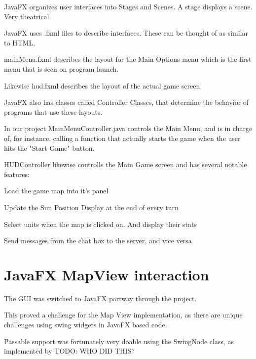 \documentclass[12pt,a4paper]{article}
\begin{document}
JavaFX organizes user interfaces into Stages and Scenes. A stage displays a 
scene. Very theatrical.

JavaFX uses .fxml files to describe interfaces. These can be thought of as
similar to HTML.

mainMenu.fxml describes the layout for the Main Options menu which is the first
menu that is seen on program launch.

Likewise hud.fxml describes the layout of the actual game screen.

JavaFX also has classes called Controller Classes, that determine the behavior
of programs that use these layouts.

In our project MainMenuController.java controls the Main Menu, and is in charge
of, for instance, calling a function that actually starts the game when the
user hits the "Start Game" button.

HUDController likewise controlls the Main Game screen and has several notable
features:

\begin{itemize}
\begin{item} Load the game map into it's panel \end{item}
\begin{item} Update the Sun Position Display at the end of every turn \end{item}
\begin{item} Select units when the map is clicked on. And display their stats
\end{item}
\begin{item} Send messages from the chat box to the server, and vice versa
\end{item}
\end{itemize}

\section{JavaFX MapView interaction}
The GUI was switched to JavaFX partway through the project.

This proved a challenge for the Map View implementation, as there are unique
challenges using swing widgets in JavaFX based code.

Passable support was fortunately very doable using the SwingNode class,
as implemented by TODO: WHO DID THIS?
\end{document}
